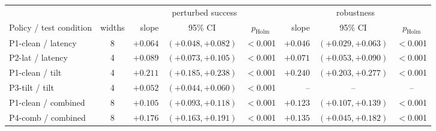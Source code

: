 \begin{tabular}{lc rcc rcc}
\toprule
& & \multicolumn{3}{c}{perturbed success} & \multicolumn{3}{c}{robustness} \\
\cmidrule(lr){3-5}\cmidrule(lr){6-8}
Policy / test condition & widths & slope & 95\% CI & $p_{\text{Holm}}$ & slope & 95\% CI & $p_{\text{Holm}}$ \\
\midrule
P1-clean / latency & 8 & $+0.064$ & $(+0.048,+0.082)$ & $<$0.001 & $+0.046$ & $(+0.029,+0.063)$ & $<$0.001 \\
P2-lat / latency & 4 & $+0.089$ & $(+0.073,+0.105)$ & $<$0.001 & $+0.071$ & $(+0.053,+0.090)$ & $<$0.001 \\
P1-clean / tilt & 4 & $+0.211$ & $(+0.185,+0.238)$ & $<$0.001 & $+0.240$ & $(+0.203,+0.277)$ & $<$0.001 \\
P3-tilt / tilt & 4 & $+0.052$ & $(+0.044,+0.060)$ & $<$0.001 & -- & -- & -- \\
P1-clean / combined & 8 & $+0.105$ & $(+0.093,+0.118)$ & $<$0.001 & $+0.123$ & $(+0.107,+0.139)$ & $<$0.001 \\
P4-comb / combined & 8 & $+0.176$ & $(+0.163,+0.191)$ & $<$0.001 & $+0.135$ & $(+0.045,+0.182)$ & $<$0.001 \\
\bottomrule
\end{tabular}
